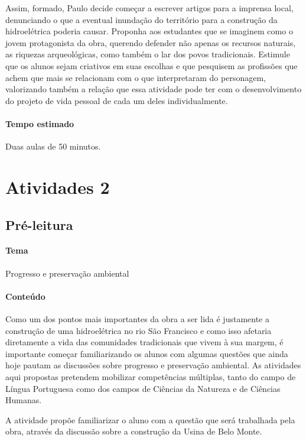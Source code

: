 \documentclass[12pt]{extarticle}
\begin{document}
Assim, formado, Paulo decide começar a escrever artigos para a
imprensa local, denunciando o que a eventual inundação do território
para a construção da hidroelétrica poderia causar. Proponha aos
estudantes que se imaginem como o jovem protagonista da obra, querendo
defender não apenas os recursos naturais, as riquezas arqueológicas,
como também o lar dos povos tradicionais. Estimule que os alunos sejam
criativos em suas escolhas e que pesquisem as profissões que achem que
mais se relacionam com o que interpretaram do personagem, valorizando
também a relação que essa atividade pode ter com o desenvolvimento do
projeto de vida pessoal de cada um deles individualmente.



\paragraph{Tempo estimado} Duas aulas de 50 minutos.

\section{Atividades 2}

\subsection{Pré-leitura}

\paragraph{Tema} Progresso e preservação ambiental


\paragraph{Conteúdo}
Como um dos pontos mais importantes da obra a ser lida é justamente a
construção de uma hidroelétrica no rio São Francisco e como isso
afetaria diretamente a vida das comunidades tradicionais que vivem à
sua margem, é importante começar familiarizando os alunos com algumas
questões que ainda hoje pautam as discussões sobre progresso e
preservação ambiental. As atividades aqui propostas pretendem
mobilizar competências múltiplas, tanto do campo de Língua Portuguesa
como dos campos de Ciências da Natureza e de Ciências Humanas.

A atividade propõe familiarizar o aluno com a questão que será
trabalhada pela obra, através da discussão sobre a construção da Usina
de Belo Monte.
\end{document}
